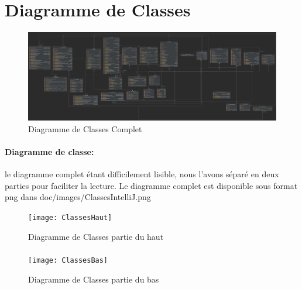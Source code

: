 \section{Diagramme de Classes}

\begin{figure}[!ht]
\includegraphics[height=1.1\textwidth]{ClassesIntelliJ}
\centering
\caption{Diagramme de Classes Complet}
\label{uml:classes}
\end{figure}

\paragraph{Diagramme de classe:} le diagramme complet étant difficilement lisible, nous l'avons séparé en deux parties pour faciliter la lecture. 
Le diagramme complet est disponible sous format png dans doc/images/ClassesIntelliJ.png

\begin{figure}[!ht]
\texttt{[image: ClassesHaut]}
\centering
\caption{Diagramme de Classes partie du haut}
\label{uml:classes-haut}
\end{figure}


\paragraph{}
\begin{figure}[!ht]
\texttt{[image: ClassesBas]}
\centering
\caption{Diagramme de Classes partie du bas}
\label{uml:classes-bas}
\end{figure}
